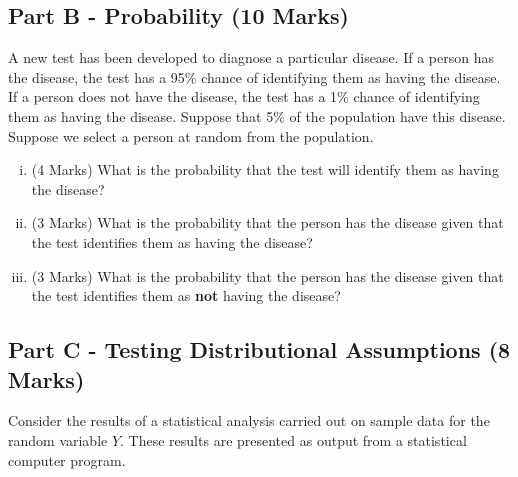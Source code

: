 \documentclass[a4paper,12pt]{article}
\begin{document}
%
%


\subsection*{Part B - Probability (10 Marks)} %
A new test has been developed to diagnose a particular disease. If a person has the disease, the test has a 95\% chance of identifying them as having the disease. 
If a person does not have the disease, the test has a 1\% chance of identifying them as having the disease. Suppose that 5\% of the population have this disease. Suppose we select a person at random from the population.


\begin{enumerate}[(i)]
	\item (4 Marks) What is the probability that the test will identify them as having the disease?
	
	\item (3 Marks) What is the probability that the person has the disease given that the test identifies them as having the disease?
	\item (3 Marks) What is the probability that the person has the disease given that the test identifies them as \textbf{not} having the disease?
\end{enumerate}



\subsection*{Part C - Testing Distributional Assumptions (8 Marks)}
Consider the results of a statistical analysis carried out on sample data for the random variable $Y$. These results are presented as output from a statistical computer program.
\end{document}
